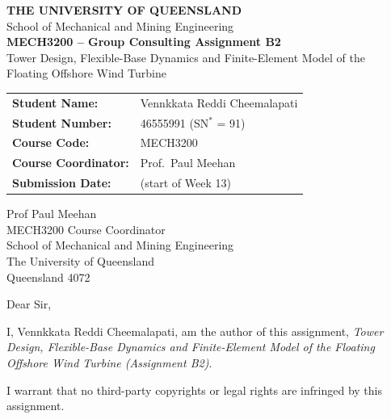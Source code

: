 \documentclass[11pt,a4paper]{article}
\begin{document}
\begin{center}
{\LARGE\bfseries THE UNIVERSITY OF QUEENSLAND}\\[6pt]
{\large School of Mechanical and Mining Engineering}\\[14pt]
{\Large\bfseries MECH3200 -- Group Consulting Assignment B2}\\[6pt]
{\large Tower Design, Flexible-Base Dynamics and Finite-Element Model of the\\ Floating Offshore Wind Turbine}\\[8pt]
\end{center}
\vspace{5mm}
\noindent
\begin{tabular}{@{}ll@{}}
\textbf{Student Name:} & Vennkkata Reddi Cheemalapati \\
\textbf{Student Number:} & 46555991 \quad (SN$^*$ = 91) \\
\textbf{Course Code:} & MECH3200 \\
\textbf{Course Coordinator:} & Prof.\ Paul Meehan \\
\textbf{Submission Date:} & \underline{\hspace{3.5cm}} (start of Week 13) \\
\end{tabular}
\vspace{8mm}

\noindent Prof Paul Meehan\\
MECH3200 Course Coordinator\\
School of Mechanical and Mining Engineering\\
The University of Queensland\\
Queensland 4072
\vspace{5mm}

\noindent Dear Sir,
\vspace{2mm}

\noindent I, Vennkkata Reddi Cheemalapati, am the author of this assignment,
\textit{Tower Design, Flexible-Base Dynamics and Finite-Element Model of the Floating Offshore Wind Turbine (Assignment B2)}.
\vspace{2mm}

\noindent I warrant that no third-party copyrights or legal rights are infringed by this assignment.
\vspace{2mm}
\end{document}

